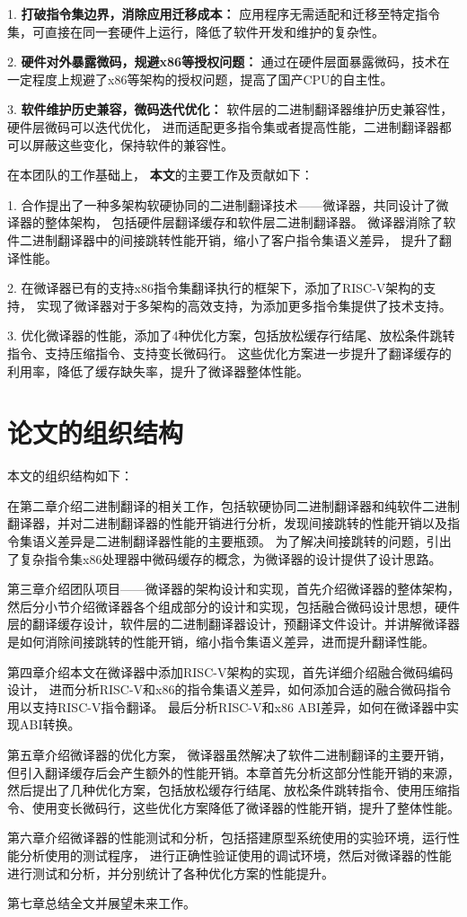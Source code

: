 1. \textbf{打破指令集边界，消除应用迁移成本：} 应用程序无需适配和迁移至特定指令集，可直接在同一套硬件上运行，降低了软件开发和维护的复杂性。

2. \textbf{硬件对外暴露微码，规避x86等授权问题：} 通过在硬件层面暴露微码，技术在一定程度上规避了x86等架构的授权问题，提高了国产CPU的自主性。

3. \textbf{软件维护历史兼容，微码迭代优化：} 软件层的二进制翻译器维护历史兼容性，硬件层微码可以迭代优化，
进而适配更多指令集或者提高性能，二进制翻译器都可以屏蔽这些变化，保持软件的兼容性。

在本团队的工作基础上，
\textbf{本文}的主要工作及贡献如下：

1. 合作提出了一种多架构软硬协同的二进制翻译技术——微译器，共同设计了微译器的整体架构，
包括硬件层翻译缓存和软件层二进制翻译器。
微译器消除了软件二进制翻译器中的间接跳转性能开销，缩小了客户指令集语义差异，
提升了翻译性能。

2. 在微译器已有的支持x86指令集翻译执行的框架下，添加了RISC-V架构的支持，
实现了微译器对于多架构的高效支持，为添加更多指令集提供了技术支持。

3. 优化微译器的性能，添加了4种优化方案，包括放松缓存行结尾、放松条件跳转指令、支持压缩指令、支持变长微码行。
这些优化方案进一步提升了翻译缓存的利用率，降低了缓存缺失率，提升了微译器整体性能。


\section{论文的组织结构}

本文的组织结构如下：

在第二章介绍二进制翻译的相关工作，包括软硬协同二进制翻译器和纯软件二进制翻译器，并对二进制翻译器的性能开销进行分析，发现间接跳转的性能开销以及指令集语义差异是二进制翻译器性能的主要瓶颈。
为了解决间接跳转的问题，引出了复杂指令集x86处理器中微码缓存的概念，为微译器的设计提供了设计思路。

第三章介绍团队项目——微译器的架构设计和实现，首先介绍微译器的整体架构，
然后分小节介绍微译器各个组成部分的设计和实现，包括融合微码设计思想，硬件层的翻译缓存设计，软件层的二进制翻译器设计，预翻译文件设计。并讲解微译器是如何消除间接跳转的性能开销，缩小指令集语义差异，进而提升翻译性能。

第四章介绍本文在微译器中添加RISC-V架构的实现，首先详细介绍融合微码编码设计，
进而分析RISC-V和x86的指令集语义差异，如何添加合适的融合微码指令用以支持RISC-V指令翻译。
最后分析RISC-V和x86 ABI差异，如何在微译器中实现ABI转换。

第五章介绍微译器的优化方案，
微译器虽然解决了软件二进制翻译的主要开销，但引入翻译缓存后会产生额外的性能开销。本章首先分析这部分性能开销的来源，然后提出了几种优化方案，包括放松缓存行结尾、放松条件跳转指令、使用压缩指令、使用变长微码行，这些优化方案降低了微译器的性能开销，提升了整体性能。

第六章介绍微译器的性能测试和分析，包括搭建原型系统使用的实验环境，运行性能分析使用的测试程序，
进行正确性验证使用的调试环境，然后对微译器的性能进行测试和分析，并分别统计了各种优化方案的性能提升。

第七章总结全文并展望未来工作。
